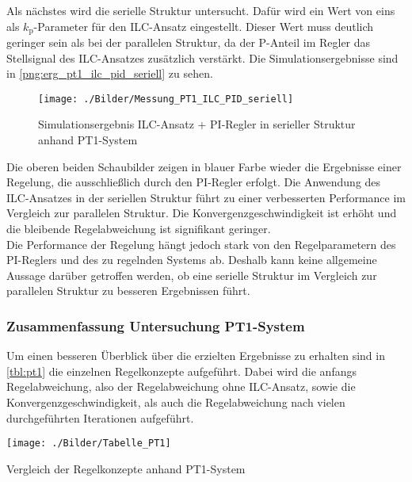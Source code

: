 Als nächstes wird die serielle Struktur untersucht. Dafür wird ein Wert von eins als $k_\mathrm{p}$-Parameter für den ILC-Ansatz eingestellt. Dieser Wert muss deutlich geringer sein als bei der parallelen Struktur, da der P-Anteil im Regler das Stellsignal des ILC-Ansatzes zusätzlich verstärkt. Die Simulationsergebnisse sind in \autoref{png:erg_pt1_ilc_pid_seriell} zu sehen.
\begin{figure}[H]
	\centering
	\texttt{[image: ./Bilder/Messung\_PT1\_ILC\_PID\_seriell]}
	\caption{Simulationsergebnis ILC-Ansatz + PI-Regler in serieller Struktur anhand PT1-System}
	\label{png:erg_pt1_ilc_pid_seriell}
\end{figure}
Die oberen beiden Schaubilder zeigen in blauer Farbe wieder die Ergebnisse einer Regelung, die ausschließlich durch den PI-Regler erfolgt. Die Anwendung des ILC-Ansatzes in der seriellen Struktur führt zu einer verbesserten Performance im Vergleich zur parallelen Struktur. Die Konvergenzgeschwindigkeit ist erhöht und die bleibende Regelabweichung ist signifikant geringer.\\
Die Performance der Regelung hängt jedoch stark von den Regelparametern des PI-Reglers und des zu regelnden Systems ab. Deshalb kann keine allgemeine Aussage darüber getroffen werden, ob eine serielle Struktur im Vergleich zur parallelen Struktur zu besseren Ergebnissen führt.

\subsubsection{Zusammenfassung Untersuchung PT1-System}
Um einen besseren Überblick über die erzielten Ergebnisse zu erhalten sind in \autoref{tbl:pt1} die einzelnen Regelkonzepte aufgeführt. Dabei wird die anfangs Regelabweichung, also der Regelabweichung ohne ILC-Ansatz, sowie die Konvergenzgeschwindigkeit, als auch die Regelabweichung nach vielen durchgeführten Iterationen aufgeführt.
\begin{table}[h]
	\centering
	\texttt{[image: ./Bilder/Tabelle\_PT1]}
	\caption{Vergleich der Regelkonzepte anhand PT1-System}
	\label{tbl:pt1}
\end{table}

